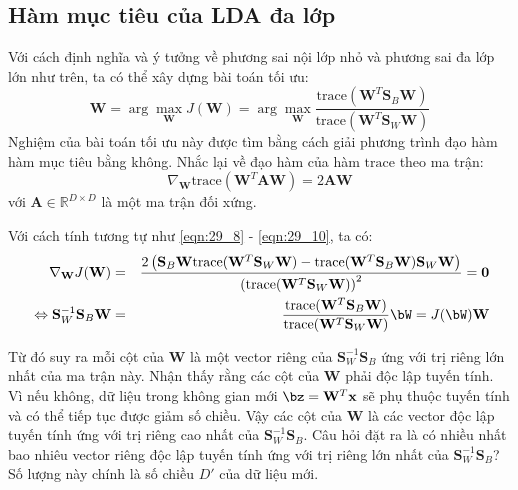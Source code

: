  
 
\subsection{Hàm mục tiêu của LDA đa lớp}
Với cách định nghĩa và ý tưởng về phương sai nội lớp nhỏ và phương sai đa lớp lớn như trên, ta có thể xây dựng bài toán tối ưu:
\begin{equation} 
  \mathbf{W} = \arg\max_{\mathbf{W}}J(\mathbf{W}) =  \arg\max_{\mathbf{W}} \frac{\text{trace}(\mathbf{W}^T\mathbf{S}_B\mathbf{W})}{\text{trace}(\mathbf{W}^T\mathbf{S}_W\mathbf{W})} 
\end{equation} 
Nghiệm của bài toán tối ưu này được tìm bằng cách giải phương trình đạo hàm hàm mục tiêu bằng không. Nhắc lại về đạo hàm của hàm $\text{trace}$ theo ma trận: 
\begin{equation} 
  \nabla_{\mathbf{W}} \text{trace}(\mathbf{W}^T\mathbf{A} \mathbf{W}) = 2\mathbf{A}\mathbf{W} 
\end{equation} 
với $\mathbf{A} \in \mathbb{R}^{D \times D}$ là một ma trận đối xứng. 
 
Với cách tính tương tự như \eqref{eqn:29_8} - \eqref{eqn:29_10}, ta có: 
\begin{eqnarray*} 
  \nabla_{\mathbf{W}} J(\mathbf{W}) &=& \frac{2 \left( \mathbf{S}_B\mathbf{W} \text{trace}(\mathbf{W}^T\mathbf{S}_W\mathbf{W}) - \text{trace}(\mathbf{W}^T\mathbf{S}_B\mathbf{W})\mathbf{S}_W \mathbf{W} \right)}{\left(\text{trace}(\mathbf{W}^T\mathbf{S}_W\mathbf{W})\right)^2}  = \mathbf{0}\\\ 
  \label{eqn:29_24}
  \Leftrightarrow \mathbf{S}_W^{-1}\mathbf{S}_B\mathbf{W}&=& \frac{\text{trace}(\mathbf{W}^T\mathbf{S}_B\mathbf{W})}{\text{trace}(\mathbf{W}^T\mathbf{S}_W\mathbf{W})} \bW = J(\bW) \mathbf{W}
\end{eqnarray*} 
 
Từ đó suy ra mỗi cột của $\mathbf{W}$ là một vector riêng của $\mathbf{S}_W^{-1}
\mathbf{S}_B$ ứng với trị riêng lớn nhất của ma trận này. Nhận thấy rằng các cột
của $\mathbf{W}$ phải độc lập tuyến tính. Vì nếu không, dữ liệu trong không
gian mới $\bz = \mathbf{W}^T\mathbf{x}$ sẽ phụ thuộc tuyến tính và có thể tiếp
tục được giảm số chiều. Vậy các cột của $\mathbf{W}$ là các vector độc lập tuyến
tính ứng với trị riêng cao nhất của $\mathbf{S}_W^{-1} \mathbf{S}_B$. Câu hỏi
đặt ra là có nhiều nhất bao nhiêu vector riêng độc lập tuyến tính ứng với trị
riêng lớn nhất của $\mathbf{S}_W^{-1} \mathbf{S}_B$? Số lượng này chính là
số chiều $D'$ của dữ liệu mới. 

